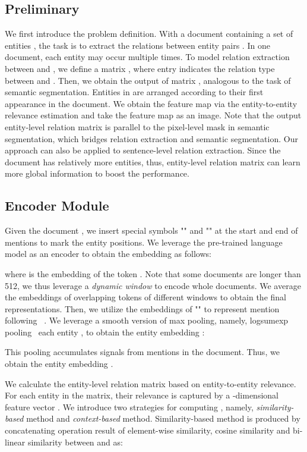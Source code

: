 \documentclass{article}
\begin{document}
\subsection{Preliminary}
We first introduce the problem definition. With a document  containing a set of entities  , the task is to extract the relations between entity pairs  . In one document, each entity  may occur multiple times.  To model relation extraction between  and , we define a  matrix , where entry  indicates the relation type between  and . Then, we obtain the output of matrix , analogous to the task of semantic segmentation. Entities in  are arranged according to their first appearance in the document. We obtain the feature map via the entity-to-entity relevance estimation and take the feature map as an image. Note that the output entity-level relation matrix  is parallel to the pixel-level mask in semantic segmentation, which bridges relation extraction and semantic segmentation. Our approach can also be applied to sentence-level relation extraction. Since the document has relatively more entities, thus, entity-level relation matrix can learn more global information to boost the performance.

\subsection{Encoder Module}
Given the document , we insert special symbols "" and "" at the start and end of mentions to mark the entity positions. We leverage the pre-trained language model as an encoder to obtain the embedding as follows:

where  is the embedding of the token . Note that some documents are longer than 512, we thus leverage a \emph{dynamic window} to encode whole documents. We average the embeddings of overlapping tokens of different windows to obtain the final representations. Then, we utilize the embeddings of "" to represent mention following~ \cite{Verga2018SimultaneouslyST}. We leverage a smooth version of max pooling, namely, logsumexp pooling~\cite{Jia2019DocumentLevelNR} each entity  , to obtain the entity embedding :

This pooling accumulates signals from mentions in the document. Thus, we obtain the entity embedding .

We calculate the entity-level relation matrix based on entity-to-entity relevance. For each entity  in the matrix, their relevance is captured by a -dimensional feature vector . We introduce two strategies for computing , namely, \emph{similarity-based} method and \emph{context-based} method. Similarity-based method is produced by concatenating operation result of element-wise similarity, cosine similarity and bi-linear similarity between  and  as:
\end{document}
